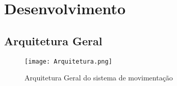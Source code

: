 \chapter{Desenvolvimento}\label{cap:CnptDsng}

\section{Arquitetura Geral}\label{sec:arqgrl}
\lipsum[5]
\begin{figure}[h]
	\centering
	\texttt{[image: Arquitetura.png]}
	\caption{Arquitetura Geral do sistema de movimentação}
	\label{fig:arq_geral}
\end{figure} 
\lipsum[5]














